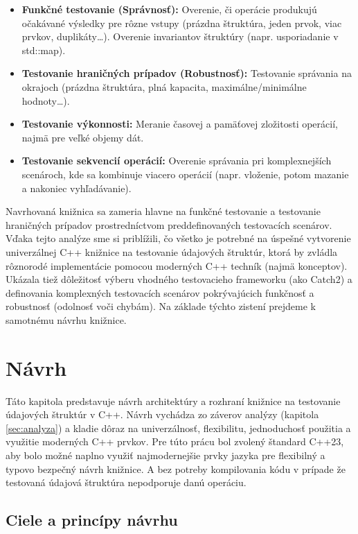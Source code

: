 \documentclass[11pt]{article}
\begin{document}
\begin{itemize}
    \item \textbf{Funkčné testovanie (Správnosť):} Overenie, či operácie produkujú očakávané výsledky pre rôzne vstupy (prázdna štruktúra, jeden prvok, viac prvkov, duplikáty\dots). Overenie invariantov štruktúry (napr. usporiadanie v std::map).
    \item \textbf{Testovanie hraničných prípadov (Robustnosť):} Testovanie správania na okrajoch (prázdna štruktúra, plná kapacita, maximálne/minimálne hodnoty\dots).
    \item \textbf{Testovanie výkonnosti:} Meranie časovej a pamäťovej zložitosti operácií, najmä pre veľké objemy dát.
    \item \textbf{Testovanie sekvencií operácií:} Overenie správania pri komplexnejších scenároch, kde sa kombinuje viacero operácií (napr. vloženie, potom mazanie a nakoniec vyhľadávanie).
\end{itemize}

Navrhovaná knižnica sa zameria hlavne na funkčné testovanie a testovanie hraničných prípadov prostredníctvom preddefinovaných testovacích scenárov. Vďaka tejto analýze sme si priblížili, čo všetko je potrebné na úspešné vytvorenie univerzálnej C++ knižnice na testovanie údajových štruktúr, ktorá by zvládla rôznorodé implementácie pomocou moderných C++ techník (najmä konceptov). Ukázala tiež dôležitosť výberu vhodného testovacieho frameworku (ako Catch2) a definovania komplexných testovacích scenárov pokrývajúcich funkčnosť a robustnosť (odolnosť voči chybám). Na základe týchto zistení prejdeme k samotnému návrhu knižnice.

\newpage
\section{Návrh} \label{sec:navrh}

Táto kapitola predstavuje návrh architektúry a rozhraní knižnice na testovanie údajových štruktúr v C++. Návrh vychádza zo záverov analýzy (kapitola \ref{sec:analyza}) a kladie dôraz na univerzálnosť, flexibilitu, jednoduchosť použitia a využitie moderných C++ prvkov. Pre túto prácu bol zvolený štandard C++23, aby bolo možné naplno využiť najmodernejšie prvky jazyka pre flexibilný a typovo bezpečný návrh knižnice. A bez potreby kompilovania kódu v prípade že testovaná údajová štruktúra nepodporuje danú operáciu.

\subsection{Ciele a princípy návrhu}
\end{document}
